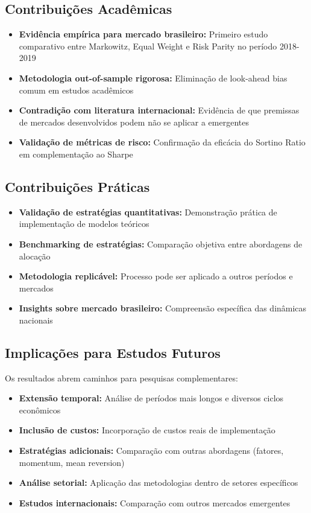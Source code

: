 \subsection{Contribuições Acadêmicas}

\begin{itemize}
    \item \textbf{Evidência empírica para mercado brasileiro:} Primeiro estudo comparativo entre Markowitz, Equal Weight e Risk Parity no período 2018-2019
    \item \textbf{Metodologia out-of-sample rigorosa:} Eliminação de look-ahead bias comum em estudos acadêmicos
    \item \textbf{Contradição com literatura internacional:} Evidência de que premissas de mercados desenvolvidos podem não se aplicar a emergentes
    \item \textbf{Validação de métricas de risco:} Confirmação da eficácia do Sortino Ratio em complementação ao Sharpe
\end{itemize}

\subsection{Contribuições Práticas}

\begin{itemize}
    \item \textbf{Validação de estratégias quantitativas:} Demonstração prática de implementação de modelos teóricos
    \item \textbf{Benchmarking de estratégias:} Comparação objetiva entre abordagens de alocação
    \item \textbf{Metodologia replicável:} Processo pode ser aplicado a outros períodos e mercados
    \item \textbf{Insights sobre mercado brasileiro:} Compreensão específica das dinâmicas nacionais
\end{itemize}

\subsection{Implicações para Estudos Futuros}

Os resultados abrem caminhos para pesquisas complementares:

\begin{itemize}
    \item \textbf{Extensão temporal:} Análise de períodos mais longos e diversos ciclos econômicos
    \item \textbf{Inclusão de custos:} Incorporação de custos reais de implementação
    \item \textbf{Estratégias adicionais:} Comparação com outras abordagens (fatores, momentum, mean reversion)
    \item \textbf{Análise setorial:} Aplicação das metodologias dentro de setores específicos
    \item \textbf{Estudos internacionais:} Comparação com outros mercados emergentes
\end{itemize}
